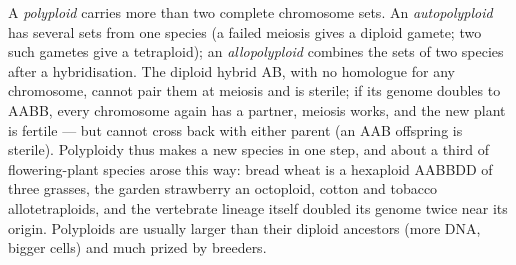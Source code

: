 \begin{definition}[Polyploidy]\label{def:b2:genome-diversification:polyploidy}
A \emph{polyploid} carries more than two complete chromosome sets.
An \emph{autopolyploid} has several sets from one species (a failed
meiosis gives a diploid gamete; two such gametes give a
tetraploid); an \emph{allopolyploid} combines the sets of two species
after a hybridisation. The diploid hybrid AB, with no homologue for
any chromosome, cannot pair them at meiosis and is sterile; if its
genome doubles to AABB, every chromosome again has a partner, meiosis
works, and the new plant is fertile --- but cannot cross back with
either parent (an AAB offspring is sterile). Polyploidy thus makes a
new species in one step, and about a third of flowering-plant
species arose this way: bread wheat is a hexaploid AABBDD of three
grasses, the garden strawberry an octoploid, cotton and tobacco
allotetraploids, and the vertebrate lineage itself doubled its
genome twice near its origin. Polyploids are usually larger than
their diploid ancestors (more DNA, bigger cells) and much prized by
breeders.
\end{definition}

